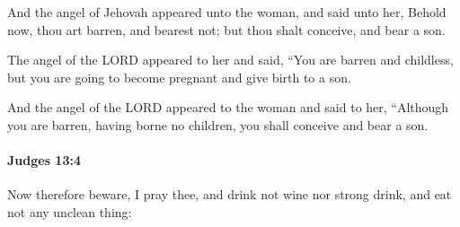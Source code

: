 			\begin{versebox}
					\item[BHS] 
					\item[ASV] And the angel of Jehovah appeared unto the woman, and said unto her, Behold now, thou art barren, and bearest not; but thou shalt conceive, and bear a son.
					\item[NIV] The angel of the LORD appeared to her and said, “You are barren and childless, but you are going to become pregnant and give birth to a son.
					\item[NRSV] And the angel of the LORD appeared to the woman and said to her, “Although you are barren, having borne no children, you shall conceive and bear a son.
			\end{versebox}

		\paragraph{Judges 13:4} %
			\label{JUDGES-13-4}

			Now therefore beware, I pray thee, and drink not wine nor strong drink, and eat not any unclean thing:

